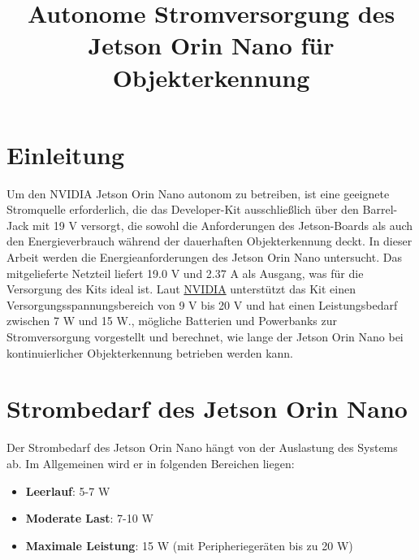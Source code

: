 \documentclass[12pt]{article}
\title{Autonome Stromversorgung des Jetson Orin Nano für Objekterkennung}
\author{}
\date{}
\begin{document}
\maketitle

\section{Einleitung}
Um den NVIDIA Jetson Orin Nano autonom zu betreiben, ist eine geeignete Stromquelle erforderlich, die das Developer-Kit ausschließlich über den Barrel-Jack mit 19 V versorgt, die sowohl die Anforderungen des Jetson-Boards als auch den Energieverbrauch während der dauerhaften Objekterkennung deckt. In dieser Arbeit werden die Energieanforderungen des Jetson Orin Nano untersucht. Das mitgelieferte Netzteil liefert 19.0 V und 2.37 A als Ausgang, was für die Versorgung des Kits ideal ist. Laut \textcolor{blue}{\href{https://developer.download.nvidia.com/assets/embedded/secure/jetson/orin_nano/docs/Jetson-Orin-Nano-DevKit-Carrier-Board-Specification_SP-11324-001_v1.2.pdf?KmgI9RJCufnwzXmxbGPExVQp1r131wrAPSzR9RMDhh83EhjqXKmYVbjwEjUNXPMiO3peL2R_7D_xp9mFQTBkPF-Bon3l72rEZPIiNTVUv5oIjQsvFsQ0pqAZxr16W-12GNU3N596RY1rC1tgxd5_XwyvJRNhcRcOank-v-QwQweH0clhI5Vvdy5dZVF-qYLeuslCScepJxD-v-TAHS2XuNFpJb69-WoTOPi_AyxiG2scwgKnqQ==&t=eyJscyI6IndlYnNpdGUiLCJsc2QiOiJkZXZlbG9wZXIubnZpZGlhLmNvbS9lbWJlZGRlZC9kb3dubG9hZHMjP3NlYXJjaD1EYXRhJTIwU2hlZXRcdTAwMjZ0eD0kcHJvZHVjdCxqZXRzb25fYWd4X29yaW4samV0c29uX29yaW5fbngsamV0c29uX29yaW5fbmFubyJ9}{NVIDIA}} unterstützt das Kit einen Versorgungsspannungsbereich von 9 V bis 20 V und hat einen Leistungsbedarf zwischen 7 W und 15 W., mögliche Batterien und Powerbanks zur Stromversorgung vorgestellt und berechnet, wie lange der Jetson Orin Nano bei kontinuierlicher Objekterkennung betrieben werden kann.

\section{Strombedarf des Jetson Orin Nano}
Der Strombedarf des Jetson Orin Nano hängt von der Auslastung des Systems ab. Im Allgemeinen wird er in folgenden Bereichen liegen:

\begin{itemize}
    \item \textbf{Leerlauf}: 5-7 W
    \item \textbf{Moderate Last}: 7-10 W
    \item \textbf{Maximale Leistung}: 15 W (mit Peripheriegeräten bis zu 20 W)
\end{itemize}
\end{document}
